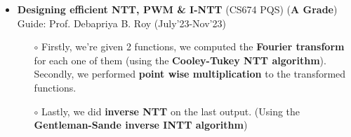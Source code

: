 \documentclass[10.8pt, a4paper]{extarticle}
\begin{document}
\begin{itemize}
 \item \textbf{Designing efficient NTT, PWM \& I-NTT} (CS674 PQS)  (\textbf{A Grade}) Guide: Prof. Debapriya B. Roy \href{https://github.com/souvikcseiitk/CS674-Post-Quantum-Security}{\faGithub{}} \hfill(July'23-Nov'23)
	\\[-0.6cm]
	\begin{itemize}
	    \item[$\circ$] Firstly, we’re given 2 functions, we computed the \textbf{Fourier transform} for each one of them (using the \textbf{Cooley-Tukey NTT algorithm}). Secondly, we performed \textbf{point wise multiplication} to the transformed functions.\\[-0.6cm]

\item[$\circ$]Lastly, we did \textbf{inverse NTT} on the last output. (Using the \textbf{Gentleman-Sande inverse INTT algorithm})\\[-0.6cm]

\end{itemize}
\end{itemize}
\vspace{2pt}
\end{document}
